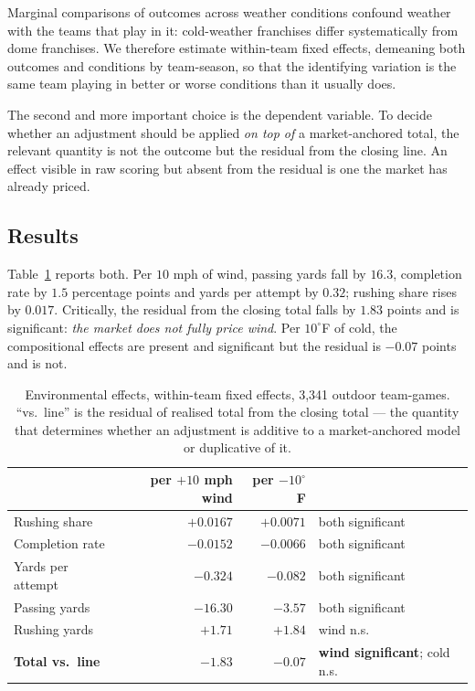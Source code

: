 \documentclass[11pt,a4paper]{article}
\begin{document}
Marginal comparisons of outcomes across weather conditions confound weather with
the teams that play in it: cold-weather franchises differ systematically from
dome franchises. We therefore estimate within-team fixed effects, demeaning both
outcomes and conditions by team-season, so that the identifying variation is the
same team playing in better or worse conditions than it usually does.

The second and more important choice is the dependent variable. To decide
whether an adjustment should be applied \emph{on top of} a market-anchored
total, the relevant quantity is not the outcome but the residual from the
closing line. An effect visible in raw scoring but absent from the residual is
one the market has already priced.

\subsection{Results}

Table~\ref{tab:weather} reports both. Per $10$ mph of wind, passing yards fall
by $16.3$, completion rate by $1.5$ percentage points and yards per attempt by
$0.32$; rushing share rises by $0.017$. Critically, the residual from the
closing total falls by $1.83$ points and is significant: \emph{the market does
not fully price wind}. Per $10^\circ$F of cold, the compositional effects are
present and significant but the residual is $-0.07$ points and is not.

\begin{table}[t]
\centering
\caption{Environmental effects, within-team fixed effects, 3{,}341 outdoor
team-games. ``vs.\ line'' is the residual of realised total from the closing
total --- the quantity that determines whether an adjustment is additive to a
market-anchored model or duplicative of it.}
\label{tab:weather}
\begin{tabular}{lrrl}
\toprule
& per $+10$ mph wind & per $-10^\circ$F & \\
\midrule
Rushing share        & $+0.0167$ & $+0.0071$ & both significant \\
Completion rate      & $-0.0152$ & $-0.0066$ & both significant \\
Yards per attempt    & $-0.324$  & $-0.082$  & both significant \\
Passing yards        & $-16.30$  & $-3.57$   & both significant \\
Rushing yards        & $+1.71$   & $+1.84$   & wind n.s. \\
\midrule
\textbf{Total vs.\ line} & $\mathbf{-1.83}$ & $-0.07$ & \textbf{wind significant}; cold n.s. \\
\bottomrule
\end{tabular}
\end{table}
\end{document}
